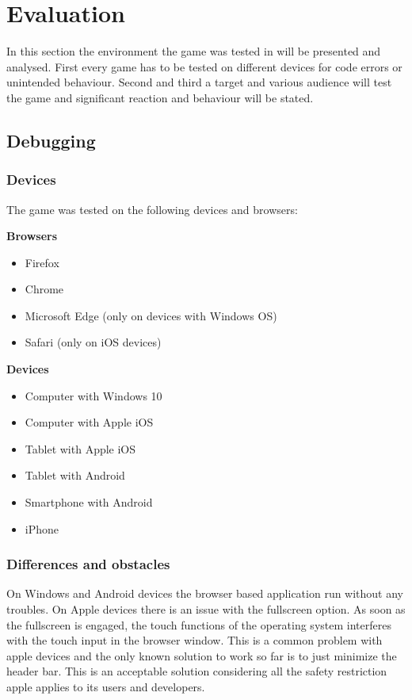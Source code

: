 
\chapter{Evaluation}\label{ch:evaluation}
In this section the environment the game was tested in will be presented and analysed.
First every game has to be tested on different devices for code errors or unintended behaviour.
Second and third a target and various audience will test the game and significant reaction and behaviour will be stated.

\section{Debugging}
\subsection{Devices}
The game was tested on the following devices and browsers:

\textbf{Browsers}
\begin{itemize}
    \item Firefox
    \item Chrome
    \item Microsoft Edge (only on devices with Windows OS)
    \item Safari (only on iOS devices)
\end{itemize}

\textbf{Devices}
\begin{itemize}
    \item Computer with Windows 10
    \item Computer with Apple iOS
    \item Tablet with Apple iOS
    \item Tablet with Android
    \item Smartphone with Android
    \item iPhone
\end{itemize}

\subsection{Differences and obstacles}
On Windows and Android devices the browser based application run without any troubles.
On Apple devices there is an issue with the fullscreen option.
As soon as the fullscreen is engaged, the touch functions of the operating system interferes with the touch input in the
browser window. This is a common problem with apple devices and the only known solution to work so far is to just
minimize the header bar.
This is an acceptable solution considering all the safety restriction apple applies to its users and developers.

